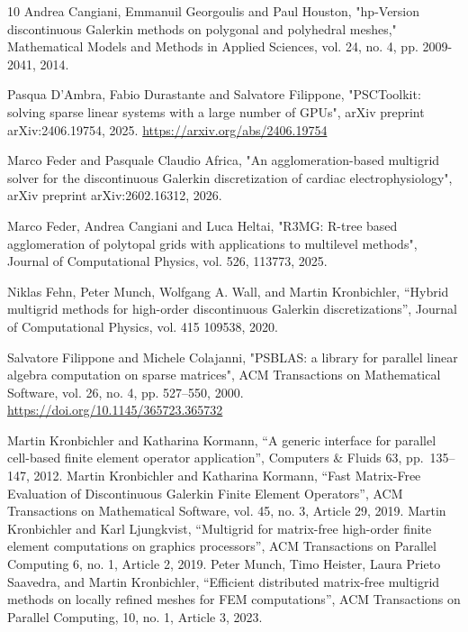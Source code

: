 \documentclass[a4paper,12pt]{article}
\begin{document}
\begin{thebibliography}{10}
    Andrea Cangiani, Emmanuil Georgoulis and Paul Houston, "hp-Version discontinuous Galerkin methods on polygonal and polyhedral meshes," Mathematical Models and Methods in Applied Sciences, vol. 24, no. 4, pp. 2009-2041, 2014.
      
    Pasqua D'Ambra, Fabio Durastante and Salvatore Filippone, "PSCToolkit: solving sparse linear systems with a large number of GPUs", arXiv preprint arXiv:2406.19754, 2025. \url{https://arxiv.org/abs/2406.19754}
      
    Marco Feder and Pasquale Claudio Africa, "An agglomeration-based multigrid solver for the discontinuous Galerkin discretization of cardiac electrophysiology", arXiv preprint arXiv:2602.16312, 2026.
      
    Marco Feder, Andrea Cangiani and Luca Heltai, "R3MG: R-tree based agglomeration of polytopal grids with applications to multilevel methods", Journal of Computational Physics, vol. 526, 113773, 2025.

     Niklas Fehn, Peter Munch, Wolfgang A. Wall, and Martin Kronbichler, ``Hybrid multigrid methods for high-order discontinuous {G}alerkin discretizations'', Journal of Computational Physics, vol. 415 109538, 2020.

    Salvatore Filippone and Michele Colajanni, "PSBLAS: a library for parallel linear algebra computation on sparse matrices", ACM Transactions on Mathematical Software, vol. 26, no. 4, pp. 527--550, 2000. \url{https://doi.org/10.1145/365723.365732}
      

	 Martin Kronbichler and Katharina Kormann, ``A generic interface for parallel cell-based finite element operator application'', Computers \& Fluids 63, pp.~135--147, 2012.
	Martin Kronbichler and Katharina Kormann, ``Fast Matrix-Free Evaluation of Discontinuous Galerkin Finite Element Operators'', ACM Transactions on Mathematical Software, vol. 45, no. 3, Article 29, 2019.
	Martin Kronbichler and Karl Ljungkvist, ``Multigrid for matrix-free high-order finite element computations on graphics processors'', ACM Transactions on Parallel Computing 6, no. 1, Article 2, 2019.
	Peter Munch, Timo Heister, Laura Prieto Saavedra, and Martin Kronbichler, ``Efficient distributed matrix-free multigrid methods on locally refined meshes for FEM computations'', ACM Transactions on Parallel Computing, 10, no. 1, Article 3, 2023.
    

\end{thebibliography}



\label{MyLastPage}
\end{document}
